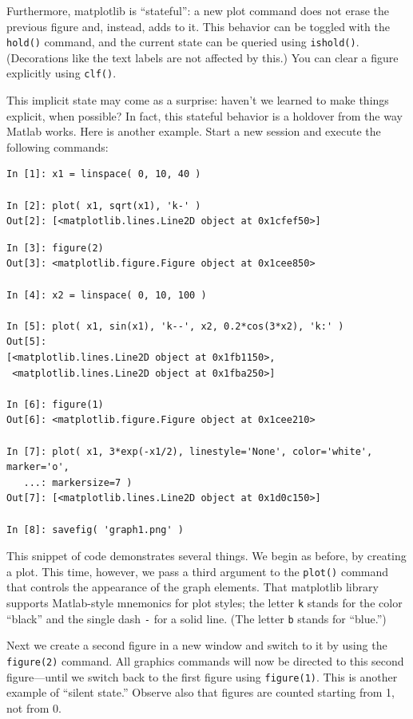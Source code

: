 Furthermore, matplotlib is ``stateful'': a new plot command does not
erase the previous figure and, instead, adds to it. This behavior can
be toggled with the \texttt{hold()} command, and the current state can
be queried using \texttt{ishold()}. (Decorations like the text labels
are not affected by this.) You can clear a figure explicitly using
\texttt{clf()}.

This implicit state may come as a surprise: haven't we learned to make
things explicit, when possible? In fact, this stateful behavior is a
holdover from the way Matlab works. Here is another example. Start a
new session and execute the following commands:

\begin{verbatim}
In [1]: x1 = linspace( 0, 10, 40 )

In [2]: plot( x1, sqrt(x1), 'k-' )
Out[2]: [<matplotlib.lines.Line2D object at 0x1cfef50>]
\end{verbatim}

\begin{verbatim}
In [3]: figure(2)
Out[3]: <matplotlib.figure.Figure object at 0x1cee850>

In [4]: x2 = linspace( 0, 10, 100 )

In [5]: plot( x1, sin(x1), 'k--', x2, 0.2*cos(3*x2), 'k:' )
Out[5]: 
[<matplotlib.lines.Line2D object at 0x1fb1150>,
 <matplotlib.lines.Line2D object at 0x1fba250>]

In [6]: figure(1)
Out[6]: <matplotlib.figure.Figure object at 0x1cee210>

In [7]: plot( x1, 3*exp(-x1/2), linestyle='None', color='white', marker='o', 
   ...: markersize=7 )
Out[7]: [<matplotlib.lines.Line2D object at 0x1d0c150>]

In [8]: savefig( 'graph1.png' )
\end{verbatim}

This snippet of code demonstrates several things. We begin as before,
by creating a plot. This time, however, we pass a third argument to
the \texttt{plot()} command that controls the appearance of the graph
elements. That matplotlib library supports Matlab-style mnemonics for
plot styles; the letter \texttt{k} stands for the color ``black'' and
the single dash \texttt{-} for a solid line. (The letter \texttt{b}
stands for ``blue.'')

Next we create a second figure in a new window and switch to it by
using the \texttt{figure(2)} command. All graphics commands will now
be directed to this second figure---until we switch back to the
first figure using \texttt{figure(1)}. This is another example of
``silent state.'' Observe also that figures are counted starting from 1,
not from 0.

